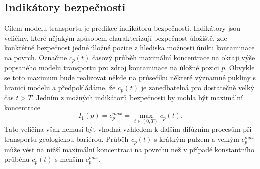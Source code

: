 \documentclass{article}
\begin{document}
%

\subsection{Indikátory bezpečnosti}
Cílem modelu transportu je predikce indikátorů bezpečnosti. Indikátory jsou veličiny, které nějakým způsobem charakterizují bezpečnost úložiště, zde konkrétně bezpečnost jedné úložné pozice z hlediska možnosti úniku kontaminace na povrch. Označme $c_p(t)$ 
časový průběh maximální koncentrace na okraji výše popsaného modelu transportu pro zdroj kontaminace na úložné pozici $p$. Obvykle se toto maximum bude realizovat někde na průsečíku některé významné pukliny s hranicí modelu
a předpokládáme, že $c_p(t)$ je zanedbatelná pro dostatečně velký čas $t>T$.
Jedním z možných indikátorů bezpečnosti by mohla být maximální koncentrace
\begin{equation}
    I_1(p) = c_p^{max} = \max_{t\in(0, T)} c_p(t).
\end{equation}
Tato veličina však nemusí být vhodná vzhledem k dalším difúzním procesům při transportu geologickou bariérou.
Průběh $c_p(t)$ s krátkým pulzem a velkým $c_p^{max}$ může vést na nižší maximální koncentraci na povrchu než v případě konstantního průběhu $c_p(t)$ s menším  $c_p^{max}$.
\end{document}
